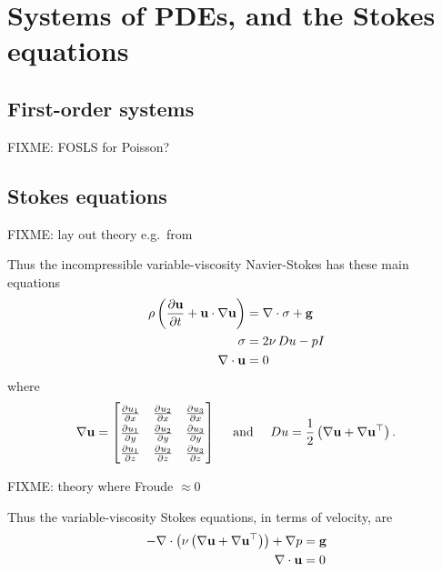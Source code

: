 
\chapter{Systems of PDEs, and the Stokes equations}
\label{chap:stokes}

\section{First-order systems}

FIXME: FOSLS for Poisson?

\section{Stokes equations}

FIXME: lay out theory e.g.~from \citep{Acheson1990,Elmanetal2005,Ockendonetal2003}

Thus the incompressible variable-viscosity Navier-Stokes has these main equations
\begin{align}
\rho \left(\frac{\partial \mathbf{u}}{\partial t} + \mathbf{u} \cdot \nabla \mathbf{u}\right) &= \nabla\cdot \sigma + \mathbf{g} \label{stokesgeneralconserve} \\
\sigma &= 2 \nu\, Du - p I \label{stokesgenerallaw} \\
\nabla\cdot \mathbf{u} &= 0 \label{stokesgeneralincomp}
\end{align}
where
  $$\grad \bu = \renewcommand{\arraystretch}{1.3}\begin{bmatrix}
    \frac{\partial u_1}{\partial x} & \frac{\partial u_2}{\partial x} & \frac{\partial u_3}{\partial x} \\
    \frac{\partial u_1}{\partial y} & \frac{\partial u_2}{\partial y} & \frac{\partial u_3}{\partial y} \\
    \frac{\partial u_1}{\partial z} & \frac{\partial u_2}{\partial z} & \frac{\partial u_3}{\partial z}
    \end{bmatrix}
    \quad \text{ and } \quad
    D u = \frac{1}{2} \left(\grad \bu + \grad \bu^{\top}\right).$$

FIXME: theory where Froude $\approx 0$

Thus the variable-viscosity Stokes equations, in terms of velocity, are
\begin{align*}
- \nabla\cdot \left(\nu \left(\nabla \mathbf{u} + \nabla \mathbf{u}^{\top}\right)\right) + \nabla p &= \mathbf{g} \\
\nabla\cdot \mathbf{u} &= 0
\end{align*}


